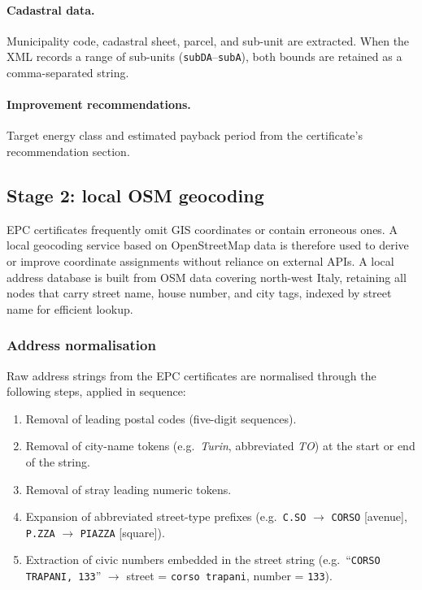 \documentclass[runningheads,orivec]{llncs}
\begin{document}
\paragraph{Cadastral data.}
Municipality code, cadastral sheet, parcel, and sub-unit
are extracted. When the XML records a range
of sub-units (\texttt{subDA}--\texttt{subA}), both bounds are
retained as a comma-separated string.

\paragraph{Improvement recommendations.}
Target energy class and estimated payback period from the
certificate's recommendation section.

\subsection{Stage 2: local OSM geocoding}
\label{sec:geocoding}

EPC certificates frequently omit GIS coordinates or contain
erroneous ones. A local geocoding service based on OpenStreetMap
data is therefore used to derive or improve coordinate assignments
without reliance on external APIs.
A local address database is built from OSM data covering
north-west Italy, retaining all nodes that carry street name,
house number, and city tags, indexed by street name for efficient lookup.

\subsubsection{Address normalisation}

Raw address strings from the EPC certificates are normalised
through the following steps, applied in sequence:

\begin{enumerate}
  \item Removal of leading postal codes (five-digit sequences).
  \item Removal of city-name tokens (e.g.~\textit{Turin}, abbreviated \textit{TO})
        at the start or end of the string.
  \item Removal of stray leading numeric tokens.
  \item Expansion of abbreviated street-type prefixes
        (e.g.\ \texttt{C.SO} $\to$ \texttt{CORSO} [avenue],
        \texttt{P.ZZA} $\to$ \texttt{PIAZZA} [square]).
  \item Extraction of civic numbers embedded in the street string
        (e.g.\ ``\texttt{CORSO TRAPANI, 133}'' $\to$
        street = \texttt{corso trapani}, number = \texttt{133}).
\end{enumerate}
\end{document}
